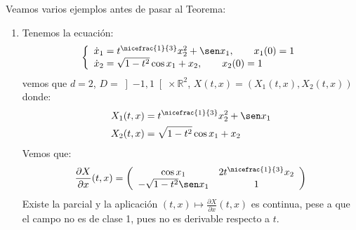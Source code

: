 \begin{ejemplo}
    Veamos varios ejemplos antes de pasar al Teorema:
    \begin{enumerate}
        \item Tenemos la ecuación:
            \begin{equation*}
                \left\{\begin{array}{l}
                        \dot{x}_1 = t^{\nicefrac{1}{3}}x_2^2 + \sen x_1, \qquad x_1(0) = 1 \\
                        \dot{x}_2 = \sqrt{1-t^2}\cos x_1 + x_2, \qquad x_2(0) = 1
                \end{array}\right.
            \end{equation*}
            vemos que $d=2$, $D = \left]-1,1\right[\times \mathbb{R}^2$, $X(t,x)=(X_1(t,x),X_2(t,x))$ donde:
            \begin{align*}
                X_1(t,x) &=  t^{\nicefrac{1}{3}}x_2^2 + \sen x_1 \\
                X_2(t,x) &= \sqrt{1-t^2}\cos x_1 + x_2
            \end{align*}  
            Vemos que:
            \begin{equation*}
                \frac{\partial X}{\partial x}(t,x) = \left(\begin{array}{cc}
                    \cos x_1 & 2t^{\nicefrac{1}{3}}x_2 \\
                     -\sqrt{1-t^2}\sen x_1 &  1
                \end{array}\right)
            \end{equation*}
            Existe la parcial y la aplicación $(t,x)\longmapsto \frac{\partial X}{\partial x}(t,x)$ es continua, pese a que el campo no es de clase 1, pues no es derivable respecto a $t$. 


\end{enumerate}
\end{ejemplo}
